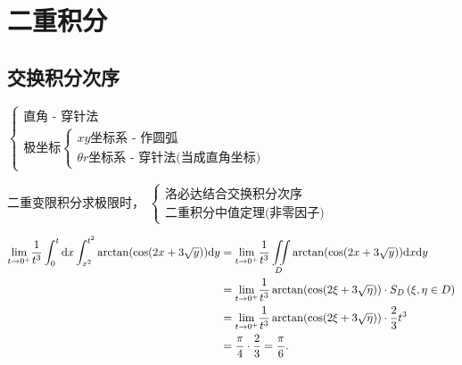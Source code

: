 \chapter{二重积分}

\section{交换积分次序}

$ \begin{cases}
    \textrm{直角 - 穿针法}\\
    \textrm{极坐标}\begin{cases}
        xy\textrm{坐标系 - 作圆弧}\\ 
        \theta r\textrm{坐标系 - 穿针法(当成直角坐标)}
    \end{cases}
\end{cases} $ 

二重变限积分求极限时，
$ \begin{cases}
    \textrm{洛必达结合交换积分次序}\\\textrm{二重积分中值定理(非零因子)}
\end{cases} $ 


\begin{equation*}
    \begin{aligned}
        {\displaystyle\lim_{t\rightarrow 0^+}}\dfrac{1}{t^3}\int_0^t\mathrm{d}x
        \int_{x^2}^{t^2}\arctan(\cos(2x+3\displaystyle\sqrt{y}))\mathrm{d}y &= 
        {\displaystyle\lim_{t\rightarrow 0^+}}\dfrac{1}{t^3}\iint\limits_{D}
        \arctan(\cos(2x+3\displaystyle\sqrt{y}))\mathrm{d}x\mathrm{d}y
        \\&= {\displaystyle\lim_{t\rightarrow 0^+}}\dfrac{1}{t^3}
        \arctan(\cos(2\xi+3\displaystyle\sqrt{\eta}))\cdot S_D \,(\xi,\eta \in D)
        \\&= {\displaystyle\lim_{t\rightarrow 0^+}}\dfrac{1}{t^3}
        \arctan(\cos(2\xi+3\displaystyle\sqrt{\eta}))\cdot\dfrac{2}{3}t^3
        \\&= \dfrac{\pi}{4}\cdot\dfrac{2}{3} = \dfrac{\pi}{6}.
    \end{aligned}
\end{equation*}


